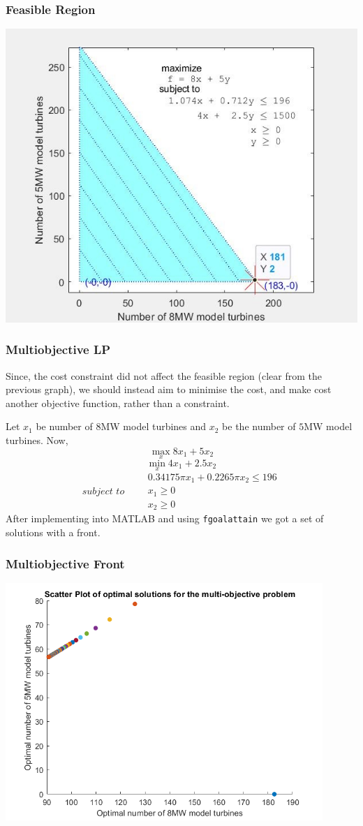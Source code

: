 \documentclass{beamer}
\begin{document}
\begin{frame}
  \frametitle{Feasible Region}
  \includegraphics[width=0.9\linewidth]{./figures/fig4.jpg}
\end{frame}

\begin{frame}
  \frametitle{Multiobjective LP}
  
  Since, the cost constraint did not affect the feasible region (clear from the previous graph), we should instead aim to minimise the cost, and make cost another objective function, rather than a constraint. \pause
 
  Let $x_1$ be number of $8$MW model turbines and $x_2$ be the number of $5$MW model turbines. \pause Now,
  $$ \max_{x} 8x_1 + 5x_2 $$
  $$ \min_{x} 4x_1 + 2.5x_2 $$
  $$ subject\,\, to \qquad\begin{matrix}
    0.34175\pi x_1 + 0.2265\pi x_2 \le 196\\
    x_1 \ge 0\\
    x_2 \ge 0
  \end{matrix} $$\pause
  After implementing into MATLAB and using \texttt{fgoalattain} we got a set of solutions with a front.
\end{frame}


\begin{frame}
  \frametitle{Multiobjective Front}
  \includegraphics[width=0.9\textwidth]{./figures/fig5.png}
\end{frame}
\end{document}
